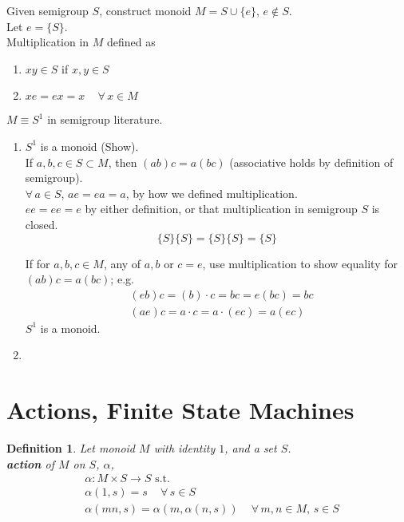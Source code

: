\documentclass[10pt]{amsart}
\newtheorem{definition}{Definition}
\begin{document}
\begin{multicols*}{2}
Given semigroup $S$, construct monoid $M = S \cup \lbrace e \rbrace$, $e\notin S$. \\
Let $e=\lbrace S \rbrace$. \\
Multiplication in $M$ defined as 
\begin{enumerate}
	\item $xy \in S$ if $x,y \in S$ 
	\item $xe=ex = x \quad \, \forall \, x \in M$
\end{enumerate}
$M \equiv S^1$ in semigroup literature.

\begin{enumerate}
	\item $S^1$ is a monoid (Show). \\
	If $a,b,c \in S \subset M$, then $(ab)c = a(bc)$ (associative holds by definition of semigroup). \\
	$\forall \, a \in S$, $ae = ea =a$, by how we defined multiplication. \\
	$ee = ee =e $ by either definition, or that multiplication in semigroup $S$ is closed.
	\[
	\lbrace S \rbrace \lbrace S \rbrace = \lbrace S \rbrace \lbrace S \rbrace = \lbrace S \rbrace
	\]
	
	If for $a,b,c \in M$, any of $a,b$ or $c=e$, use multiplication to show equality for $(ab)c = a(bc)$; e.g.
	\[
	\begin{aligned}
	& (eb) c = (b)\cdot c = bc = e(bc) = bc \\ 
	& (ae) c = a\cdot c =a \cdot (ec) = a(ec)
	\end{aligned}
	\]
	$S^1$ is a monoid.
	\item 
\end{enumerate}

\section{Actions, Finite State Machines}

\begin{definition}
Let monoid $M$ with identity $1$, and a set $S$. \\
\textbf{action} of $M$ on $S$, $\alpha$, \\
\begin{equation}
\begin{aligned}
& \alpha : M \times S \to S \text{ s.t. } \\  
& \alpha(1,s) = s \quad \, \forall \, s \in S \\
& \alpha(mn, s) = \alpha(m, \alpha(n, s)) \quad \, \forall \, m,n \in M, \, s\in S
\end{aligned}
\end{equation}


\end{definition}
\end{multicols*}
\end{document}
